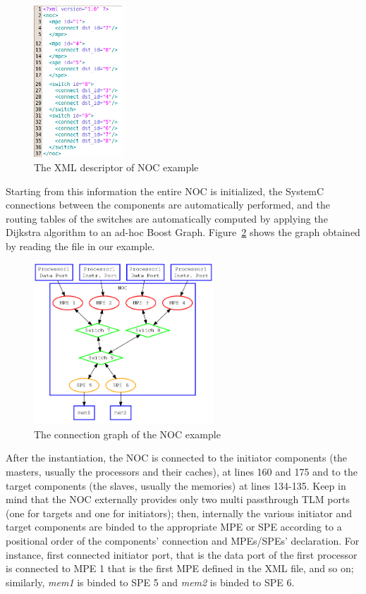 \documentclass[a4paper,11pt,oneside]{article}
\begin{document}
\begin{figure}[tbp]
\begin{center}
  \includegraphics[width=0.3\textwidth]{xml}
\end{center}
\caption{The XML descriptor of NOC example}
\label{inst:xml}
\end{figure}

Starting from this information the entire NOC is initialized, the SystemC connections between the components are automatically performed, and the routing tables of the switches are automatically computed by applying the Dijkstra algorithm to an ad-hoc Boost Graph. Figure~\ref{xml:graph} shows the graph obtained by reading the file in our example.

\begin{figure}[htbp]
\begin{center}
  \includegraphics[width=0.6\textwidth]{graph}
\end{center}
\caption{The connection graph of the NOC example}
\label{xml:graph}
\end{figure}

After the instantiation, the NOC is connected to the initiator components (the masters, usually the processors and their caches), at lines 160 and 175 and to the target components (the slaves, usually the memories) at lines 134-135. 
Keep in mind that the NOC externally provides only two multi passthrough TLM ports (one for targets and one for initiators); then, internally the various initiator and target components are binded to the appropriate MPE or SPE according to a positional order of the components' connection and MPEs/SPEs' declaration. For instance, first connected initiator port, that is the data port of the first processor is connected to MPE 1 that is the first MPE defined in the XML file, and so on; similarly, \textit{mem1} is binded to SPE 5 and \textit{mem2} is binded to SPE 6.
\end{document}
